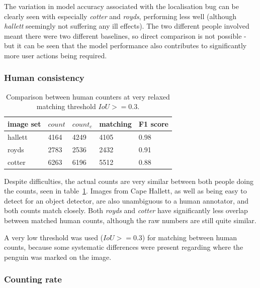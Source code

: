 The variation in model accuracy associated with the localisation bug can be clearly seen with especially \emph{cotter} and \emph{royds}, performing less well (although \emph{hallett} seemingly not suffering any ill effects). The two different people involved meant there were two different baselines, so direct comparison is not possible - but it can be seen that the model performance also contributes to significantly more user actions being required.


\subsubsection{Human consistency}

\begin{table}[h!]
    \centering
\caption{Comparison between human counters at very relaxed matching threshold $IoU >= 0.3$. }    
\begin{tabular}{lllll}
image set & $count$ & $count_c$ & matching & F1 score \\
\toprule
hallett   & 4164      & 4249      & 4105     & 0.98     \\
royds     & 2783      & 2536      & 2432     & 0.91     \\
cotter    & 6263      & 6196      & 5512     & 0.88 \\
\bottomrule
\end{tabular}
\label{tab:human_comparison} 
\end{table}
 
Despite difficulties, the actual counts are very similar between both people doing the counts, seen in table~\ref{tab:human_comparison}. Images from Cape Hallett, as well as being easy to detect for an object detector, are also unambiguous to a human annotator, and both counts match closely. Both \emph{royds} and \emph{cotter} have significantly less overlap between matched human counts, although the raw numbers are still quite similar.

A very low threshold was used ($IoU >= 0.3$) for matching between human counts, because some systematic differences were present regarding where the penguin was marked on the image.

\subsubsection {Counting rate}


